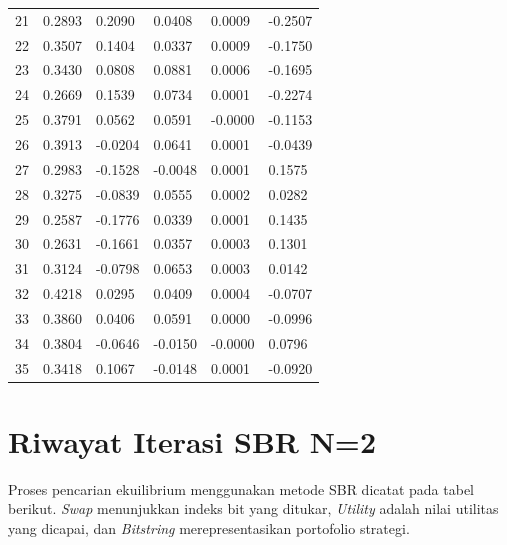 {\begin{longtable}{llllll}
21 & 0.2893 & 0.2090 & 0.0408 & 0.0009 & -0.2507 \\
22 & 0.3507 & 0.1404 & 0.0337 & 0.0009 & -0.1750 \\
23 & 0.3430 & 0.0808 & 0.0881 & 0.0006 & -0.1695 \\
24 & 0.2669 & 0.1539 & 0.0734 & 0.0001 & -0.2274 \\
25 & 0.3791 & 0.0562 & 0.0591 & -0.0000 & -0.1153 \\
26 & 0.3913 & -0.0204 & 0.0641 & 0.0001 & -0.0439 \\
27 & 0.2983 & -0.1528 & -0.0048 & 0.0001 & 0.1575 \\
28 & 0.3275 & -0.0839 & 0.0555 & 0.0002 & 0.0282 \\
29 & 0.2587 & -0.1776 & 0.0339 & 0.0001 & 0.1435 \\
30 & 0.2631 & -0.1661 & 0.0357 & 0.0003 & 0.1301 \\
31 & 0.3124 & -0.0798 & 0.0653 & 0.0003 & 0.0142 \\
32 & 0.4218 & 0.0295 & 0.0409 & 0.0004 & -0.0707 \\
33 & 0.3860 & 0.0406 & 0.0591 & 0.0000 & -0.0996 \\
34 & 0.3804 & -0.0646 & -0.0150 & -0.0000 & 0.0796 \\
35 & 0.3418 & 0.1067 & -0.0148 & 0.0001 & -0.0920 \\
\end{longtable}
}

\section{Riwayat Iterasi SBR N=2}

Proses pencarian ekuilibrium menggunakan metode SBR dicatat pada tabel berikut. \textit{Swap} menunjukkan indeks bit yang ditukar, \textit{Utility} adalah nilai utilitas yang dicapai, dan \textit{Bitstring} merepresentasikan portofolio strategi.

